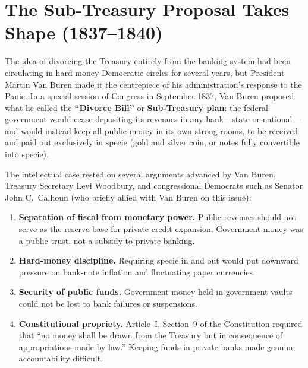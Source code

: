 \documentclass[12pt]{article}
\begin{document}
\section{The Sub-Treasury Proposal Takes Shape (1837--1840)}

The idea of divorcing the Treasury entirely from the banking system had
been circulating in hard-money Democratic circles for several years, but
President Martin Van Buren made it the centrepiece of his
administration's response to the Panic.  In a special session of
Congress in September 1837, Van Buren proposed what he called the
\textbf{``Divorce Bill''} or \textbf{Sub-Treasury plan}: the federal
government would cease depositing its revenues in any bank---state or
national---and would instead keep all public money in its own strong
rooms, to be received and paid out exclusively in specie (gold and
silver coin, or notes fully convertible into specie).

The intellectual case rested on several arguments advanced by Van Buren,
Treasury Secretary Levi Woodbury, and congressional Democrats such as
Senator John C.\ Calhoun (who briefly allied with Van Buren on this
issue):

\begin{enumerate}
  \item \textbf{Separation of fiscal from monetary power.}  Public
    revenues should not serve as the reserve base for private credit
    expansion.  Government money was a public trust, not a subsidy to
    private banking.

  \item \textbf{Hard-money discipline.}  Requiring specie in and out
    would put downward pressure on bank-note inflation and fluctuating
    paper currencies.

  \item \textbf{Security of public funds.}  Government money held in
    government vaults could not be lost to bank failures or suspensions.

  \item \textbf{Constitutional propriety.}  Article~I, Section~9 of the
    Constitution required that ``no money shall be drawn from the
    Treasury but in consequence of appropriations made by law.'' Keeping
    funds in private banks made genuine accountability difficult.
\end{enumerate}
\end{document}
